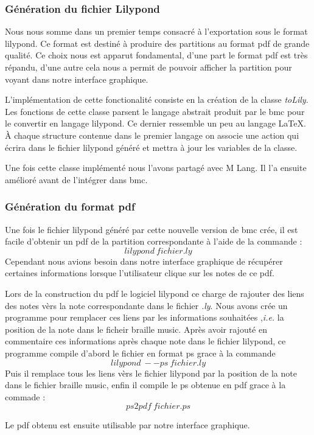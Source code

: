 
\subsubsection{Génération du fichier Lilypond}
Nous nous somme dans un premier temps consacré à l'exportation sous le
format lilypond.  Ce format est destiné à produire des partitions au
format pdf de grande qualité.  Ce choix nous est apparut fondamental,
d'une part le format pdf est très répandu, d'une autre cela nous a
permit de pouvoir afficher la partition pour voyant dans notre
interface graphique.

L'implémentation de cette fonctionalité consiste en la création de la
classe \textit{toLily}. Les fonctions de cette classe parsent le
langage abstrait produit par le bmc pour le convertir en langage
lilypond. Ce dernier ressemble un peu au langage \LaTeX. À chaque
structure contenue dans le premier langage on associe une action qui
écrira dans le fichier lilypond généré et mettra à jour les variables
de la classe.

Une fois cette classe implémenté nous l'avons partagé avec M Lang. Il
l'a ensuite amélioré avant de l'intégrer dans bmc.


\subsubsection{Génération du format pdf}
Une fois le fichier lilypond généré par cette nouvelle version de bmc
crée, il est facile d'obtenir un pdf de la partition correspondante à
l'aide de la commande : $$lilypond\ fichier.ly$$ Cependant nous
avions besoin dans notre interface graphique de récupérer certaines
informations lorsque l'utilisateur clique sur les notes de ce pdf.

Lors de la construction du pdf le logiciel lilypond ce charge de
rajouter des liens des notes vèrs la note correspondante dans le
fichier \textit{.ly}. Nous avons crée un programme pour remplacer ces
liens par les informations souhaitées ,\textit{i.e.} la position de la
note dans le ficheir braille music. Après avoir rajouté en commentaire
ces informations après chaque note dans le fichier lilypond, ce
programme compile d'abord le fichier en format ps grace à la commande
$$lilypond\ --ps\ fichier.ly$$ Puis il remplace tous les liens
vèrs le fichier lilypond par la position de la note dans le fichier
braille music, enfin il compile le ps obtenue en pdf grace à la
commade : $$ps2pdf\ fichier.ps$$

Le pdf obtenu est ensuite utilisable par notre interface graphique.

